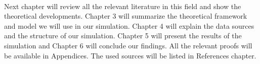 \paragraph*{}Next chapter will review all the relevant literature in this field and show the theoretical developments. Chapter 3 will summarize the theoretical framework and model we will use in our simulation. Chapter 4 will explain the data sources and the structure of our simulation. Chapter 5 will present the results of the simulation and Chapter 6 will conclude our findings. All the relevant proofs will be available in Appendices. The used sources will be listed in References chapter. 
